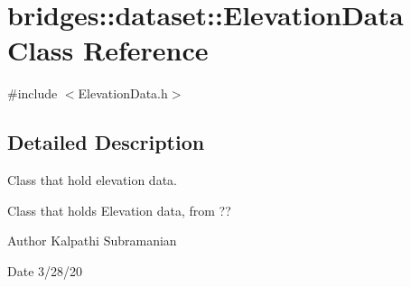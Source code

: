 \hypertarget{classbridges_1_1dataset_1_1_elevation_data}{}\section{bridges\+:\+:dataset\+:\+:Elevation\+Data Class Reference}
\label{classbridges_1_1dataset_1_1_elevation_data}


{\ttfamily \#include $<$Elevation\+Data.\+h$>$}



\subsection{Detailed Description}
Class that hold elevation data. 

Class that holds Elevation data, from ??

\begin{DoxyAuthor}{Author}
Kalpathi Subramanian
\end{DoxyAuthor}
\begin{DoxyDate}{Date}
3/28/20 
\end{DoxyDate}
